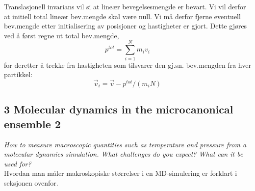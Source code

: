 \documentclass[english, a4paper]{article}
\begin{document}
Translasjonell invarians vil si at lineær bevegelsesmengde er bevart. Vi vil derfor 
at initiell total lineær bev.mengde skal være null. Vi må derfor fjerne eventuell
bev.mengde etter initialisering av posisjoner og hastigheter er gjort. Dette gjøres ved å
først regne ut total bev.mengde,
\begin{equation}
 p^{tot} = \sum_{i=1}^N m_i v_i
\end{equation}
for deretter å trekke fra hastigheten som tilsvarer den gj.sn. bev.mengden fra hver partikkel:
\begin{equation}
 \vec{v}_i = \vec{v} - p^{tot} / (m_i N)
\end{equation}




\subsection{3 Molecular dynamics in the microcanonical ensemble 2}
\textit{How to measure macroscopic quantities such as temperature and pressure from a 
molecular dynamics simulation. What challenges do you expect? What can it be used for?} \\

\noindent
Hvordan man måler makroskopiske størrelser i en MD-simulering er forklart i seksjonen ovenfor.\\
\end{document}
